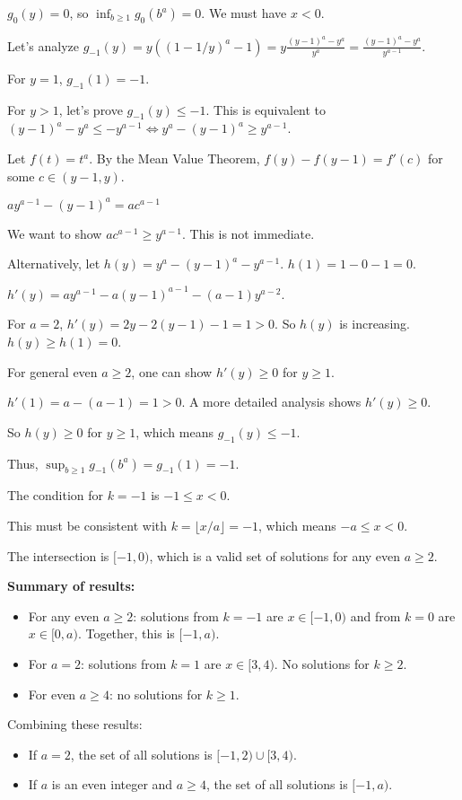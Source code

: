 \documentclass[12pt,a4paper]{article}
\theoremstyle{definition}
\begin{document}
    $g_0(y) = 0$, so $\inf_{b\ge 1} g_0(b^a) = 0$. We must have $x<0$.

    Let's analyze $g_{-1}(y) = y((1-1/y)^a-1) = y\frac{(y-1)^a-y^a}{y^a} = \frac{(y-1)^a-y^a}{y^{a-1}}$.

    For $y=1$, $g_{-1}(1)=-1$.

    For $y>1$, let's prove $g_{-1}(y) \le -1$. This is equivalent to $(y-1)^a-y^a \le -y^{a-1} \iff y^a-(y-1)^a \ge y^{a-1}$.

    Let $f(t)=t^a$. By the Mean Value Theorem, $f(y)-f(y-1)=f'(c)$ for some $c \in (y-1,y)$.

    $ay^{a-1}-(y-1)^a = a c^{a-1}$

    We want to show $ac^{a-1} \ge y^{a-1}$. This is not immediate.

    Alternatively, let $h(y) = y^a-(y-1)^a-y^{a-1}$. $h(1)=1-0-1=0$.

    $h'(y) = ay^{a-1}-a(y-1)^{a-1}-(a-1)y^{a-2}$.

    For $a=2$, $h'(y)=2y-2(y-1)-1=1>0$. So $h(y)$ is increasing. $h(y) \ge h(1)=0$.

    For general even $a \ge 2$, one can show $h'(y) \ge 0$ for $y \ge 1$.

    $h'(1)=a-(a-1)=1>0$. A more detailed analysis shows $h'(y) \ge 0$.

    So $h(y) \ge 0$ for $y\ge 1$, which means $g_{-1}(y) \le -1$.

    Thus, $\sup_{b\ge 1} g_{-1}(b^a) = g_{-1}(1)=-1$.

    The condition for $k=-1$ is $-1 \le x < 0$.

    This must be consistent with $k=\lfloor x/a \rfloor = -1$, which means $-a \le x < 0$.

    The intersection is $[-1,0)$, which is a valid set of solutions for any even $a \ge 2$.

    \textbf{Summary of results:}
    \begin{itemize}
        \item For any even $a \ge 2$: solutions from $k=-1$ are $x \in [-1,0)$ and from $k=0$ are $x \in [0,a)$. Together, this is $[-1,a)$.
        \item For $a=2$: solutions from $k=1$ are $x \in [3,4)$. No solutions for $k \ge 2$.
        \item For even $a \ge 4$: no solutions for $k \ge 1$.
    \end{itemize}

    Combining these results:
    \begin{itemize}
        \item If $a=2$, the set of all solutions is $[-1,2) \cup [3,4)$.
        \item If $a$ is an even integer and $a \ge 4$, the set of all solutions is $[-1,a)$.
    \end{itemize}
\end{document}
